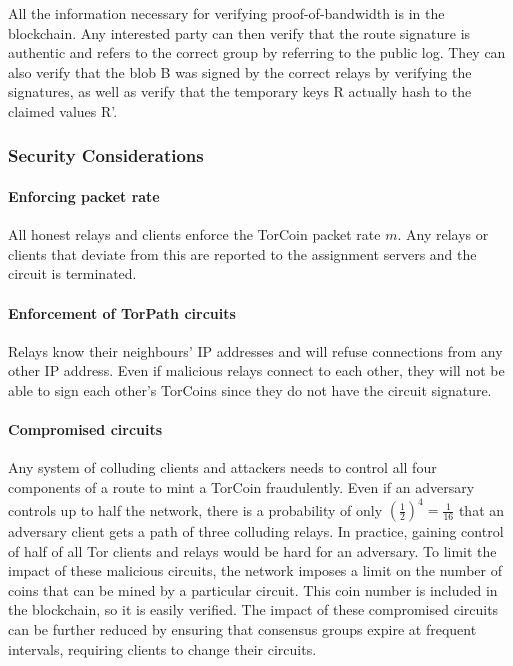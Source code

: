 All the information necessary for verifying proof-of-bandwidth is in the
blockchain. Any interested party can then verify that the route signature is
authentic and refers to the correct group by referring to the public log. They
can also verify that the blob B was signed by the correct relays by verifying
the signatures, as well as verify that the temporary keys R actually hash to
the claimed values R'.

\subsubsection{Security Considerations}

\paragraph{Enforcing packet rate} All honest relays and clients
enforce the TorCoin packet rate $m$. Any relays or clients that deviate from this
are reported to the assignment servers and the circuit is terminated.

\paragraph{Enforcement of TorPath circuits} Relays know their neighbours'
IP addresses and will refuse connections from any other IP address. Even if
malicious relays connect to each other, they will not be able to sign each
other's TorCoins since they do not have the circuit signature.

\paragraph{Compromised circuits} Any system of colluding clients and
attackers needs to control all four components of a route to mint a TorCoin
fraudulently. Even if an adversary controls up to half the network, there is a
probability of only $(\frac{1}{2})^4 = \frac{1}{16}$ that an adversary client
gets a path of three colluding relays. In practice, gaining control of half of
all Tor clients and relays would be hard for an adversary.  To limit the
impact of these malicious circuits, the network imposes a limit on the number
of coins that can be mined by a particular circuit. This coin number is
included in the blockchain, so it is easily verified. 
The impact of these
compromised circuits can be further reduced by ensuring that consensus groups
expire at frequent intervals, requiring clients to change their circuits.

